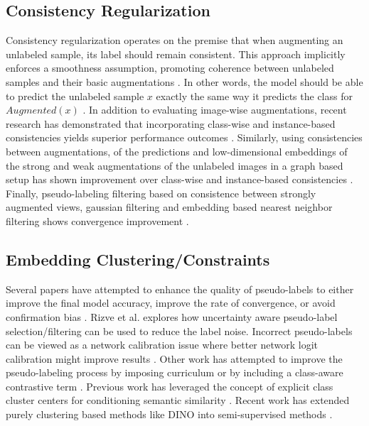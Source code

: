 \documentclass[10pt,twocolumn,letterpaper]{article}
\begin{document}


\subsection{Consistency Regularization}

Consistency regularization operates on the premise that when augmenting an unlabeled sample, its label should remain consistent. 
This approach implicitly enforces a smoothness assumption, promoting coherence between unlabeled samples and their basic augmentations \cite{xie2020unsupervised}. 
In other words, the model should be able to predict the unlabeled sample $x$ exactly the same way it predicts the class for $Augmented(x)$ \cite{berthelot2019mixmatch,sohn2020fixmatch,berthelot2019remixmatch,mustafa2020transformation}. 
In addition to evaluating image-wise augmentations, recent research has demonstrated that incorporating class-wise and instance-based consistencies yields superior performance outcomes \cite{zheng2022simmatch,li2021comatch}. 
Similarly, using consistencies between augmentations, of the predictions and low-dimensional embeddings of the strong and weak augmentations of the unlabeled images in a graph based setup has shown improvement over class-wise and instance-based consistencies \cite{zheng2023simmatchv2}.
Finally, pseudo-labeling filtering based on consistence between strongly augmented views, gaussian filtering and embedding based nearest neighbor filtering shows convergence improvement \cite{kim2022conmatch,menon2022semisupervised}.

\subsection{Embedding Clustering/Constraints}


Several papers have attempted to enhance the quality of pseudo-labels to either improve the final model accuracy, improve the rate of convergence, or avoid confirmation bias \cite{arazo2020pseudo}.
Rizve et al. \cite{rizve2021defense} explores how uncertainty aware pseudo-label selection/filtering can be used to reduce the label noise.
Incorrect pseudo-labels can be viewed as a network calibration issue \cite{rizve2021defense} where better network logit calibration might improve results \cite{Xing2020DistanceBased}.
Other work has attempted to improve the pseudo-labeling process by imposing curriculum \cite{zhang2021flexmatch} or by including a class-aware contrastive term \cite{yang2022class}.
Previous work has leveraged the concept of explicit class cluster centers for conditioning semantic similarity \cite{zheng2022simmatch}.
Recent work has extended purely clustering based methods like DINO \cite{caron2021emerging} into semi-supervised methods \cite{fini2023semi}.
\end{document}
